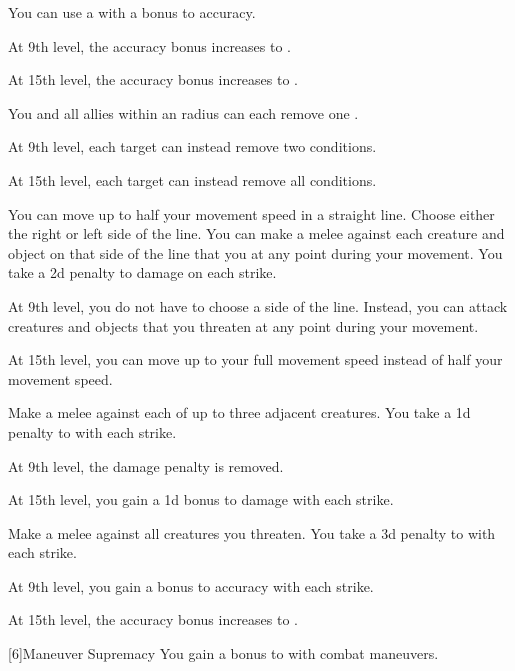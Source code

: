 {             You can use a  with a  bonus to accuracy.

            At 9th level, the accuracy bonus increases to .
            \par At 15th level, the accuracy bonus increases to .

             You and all allies within an \arealarge radius can each remove one .

            At 9th level, each target can instead remove two conditions.
            \par At 15th level, each target can instead remove all conditions.

             You can move up to half your movement speed in a straight line.
            Choose either the right or left side of the line.
            You can make a melee  against each creature and object on that side of the line that you  at any point during your movement.
            You take a \minus2d penalty to damage on each strike.

            At 9th level, you do not have to choose a side of the line.
            Instead, you can attack creatures and objects that you threaten at any point during your movement.
            \par At 15th level, you can move up to your full movement speed instead of half your movement speed.

             Make a melee  against each of up to three adjacent creatures.
            You take a \minus1d penalty to  with each strike.

            At 9th level, the damage penalty is removed.
            \par At 15th level, you gain a \plus1d bonus to damage with each strike.

             Make a melee  against all creatures you threaten.
            You take a \minus3d penalty to  with each strike.

            At 9th level, you gain a  bonus to accuracy with each strike.
            \par At 15th level, the accuracy bonus increases to .
        }

        [6]{Maneuver Supremacy} You gain a  bonus to  with combat maneuvers.

